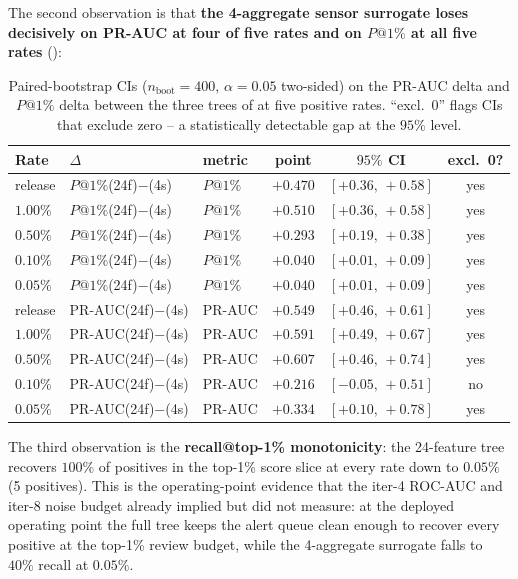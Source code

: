 The second observation is that \textbf{the 4-aggregate sensor surrogate
loses decisively on PR-AUC at four of five rates and on $P@1\%$ at all
five rates} ():

\begin{table}[t]
\centering
\small
\caption{Paired-bootstrap CIs ($n_{\text{boot}}{=}400$, $\alpha{=}0.05$
two-sided) on the PR-AUC delta and $P@1\%$ delta between the three
trees of  at five positive
rates. ``excl.\ 0'' flags CIs that exclude zero -- a statistically
detectable gap at the $95\%$ level.}
\label{tab:p8-evidence-pr-realistic-boot}
\begin{tabular}{lllccc}
\toprule
Rate & $\Delta$ & metric & point & $95\%$ CI & excl.\ 0? \\
\midrule
release & $P@1\%$(24f)$-$(4s) & $P@1\%$ & $+0.470$ & $[+0.36,\,+0.58]$ & yes \\
$1.00\%$ & $P@1\%$(24f)$-$(4s) & $P@1\%$ & $+0.510$ & $[+0.36,\,+0.58]$ & yes \\
$0.50\%$ & $P@1\%$(24f)$-$(4s) & $P@1\%$ & $+0.293$ & $[+0.19,\,+0.38]$ & yes \\
$0.10\%$ & $P@1\%$(24f)$-$(4s) & $P@1\%$ & $+0.040$ & $[+0.01,\,+0.09]$ & yes \\
$0.05\%$ & $P@1\%$(24f)$-$(4s) & $P@1\%$ & $+0.040$ & $[+0.01,\,+0.09]$ & yes \\
\midrule
release & PR-AUC(24f)$-$(4s)    & PR-AUC & $+0.549$ & $[+0.46,\,+0.61]$ & yes \\
$1.00\%$ & PR-AUC(24f)$-$(4s) & PR-AUC & $+0.591$ & $[+0.49,\,+0.67]$ & yes \\
$0.50\%$ & PR-AUC(24f)$-$(4s) & PR-AUC & $+0.607$ & $[+0.46,\,+0.74]$ & yes \\
$0.10\%$ & PR-AUC(24f)$-$(4s) & PR-AUC & $+0.216$ & $[-0.05,\,+0.51]$ & no \\
$0.05\%$ & PR-AUC(24f)$-$(4s) & PR-AUC & $+0.334$ & $[+0.10,\,+0.78]$ & yes \\
\bottomrule
\end{tabular}
\end{table}

The third observation is the \textbf{recall@top-1\% monotonicity}: the
24-feature tree recovers $100\%$ of positives in the top-1\% score
slice at every rate down to $0.05\%$ (5 positives). This is the
operating-point evidence that the iter-4 ROC-AUC and iter-8 noise
budget already implied but did not measure: at the deployed operating
point the full tree keeps the alert queue clean enough to recover every
positive at the top-1\% review budget, while the 4-aggregate surrogate
falls to $40\%$ recall at $0.05\%$.

